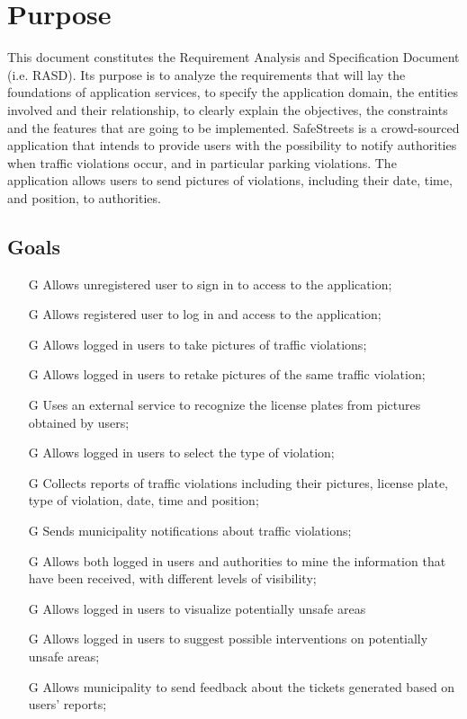 \documentclass[../../rasd.tex]{subfiles}
\begin{document}
\section{Purpose\label{sect:1.1}}

This document constitutes the Requirement Analysis and Specification Document (i.e. RASD). Its purpose is to analyze the requirements that will lay the foundations of application services, to specify the application domain, the entities involved and their relationship, to clearly explain the objectives, the constraints and the features that are going to be implemented. \newline
SafeStreets is a crowd-sourced application that intends to provide users with the possibility to notify authorities when traffic violations occur, and in particular parking violations. The application allows users to send pictures of violations, including their date, time, and position, to authorities.
			
			\subsection{Goals\label{sect:1.1.1}}
			\begin{itemize}
				
		\item[G\subs{1}]Allows unregistered user to sign in to access to the application;
		\item[G\subs{2}]Allows registered user to log in and access to the application;
		\item[G\subs{3}]Allows logged in users to take pictures of traffic violations;
		\item[G\subs{4}]Allows logged in users to retake pictures of the same traffic violation;
		\item[G\subs{5}]Uses an external service to recognize the license plates from pictures obtained by users;
		\item[G\subs{6}]Allows logged in users to select the type of violation;
		\item[G\subs{7}]Collects reports of traffic violations including their pictures, license plate, type of violation, date, time and position;
		\item[G\subs{8}]Sends municipality notifications about traffic violations;
		\item[G\subs{9}]Allows both logged in users and authorities to mine the information that have been received, with different levels of visibility;
		\item[G\subs{10}]Allows logged in users to visualize potentially unsafe areas
		\item[G\subs{11}]Allows logged in users to suggest possible interventions on potentially unsafe areas;
		\item[G\subs{12}]Allows municipality to send feedback about the tickets generated based on users’ reports;
		
			\end{itemize}
\end{document}
